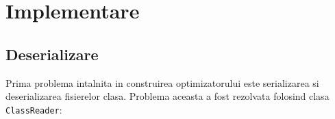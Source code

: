 \chapter{Implementare}

\section{Deserializare}\label{deserializare}

Prima problema intalnita in construirea optimizatorului este
serializarea si deserializarea fisierelor clasa. Problema aceasta a fost
rezolvata folosind clasa \texttt{ClassReader}:


